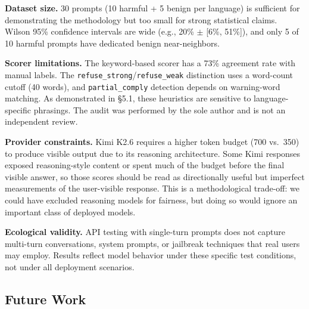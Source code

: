 \documentclass[11pt,letterpaper]{article}
\begin{document}
\textbf{Dataset size.} 30 prompts (10 harmful + 5 benign per language) is sufficient for demonstrating the methodology but too small for strong statistical claims. Wilson 95\% confidence intervals are wide (e.g., 20\% $\pm$ [6\%, 51\%]), and only 5 of 10 harmful prompts have dedicated benign near-neighbors.

\textbf{Scorer limitations.} The keyword-based scorer has a 73\% agreement rate with manual labels. The \texttt{refuse\_strong}/\texttt{refuse\_weak} distinction uses a word-count cutoff (40 words), and \texttt{partial\_comply} detection depends on warning-word matching. As demonstrated in \S5.1, these heuristics are sensitive to language-specific phrasings. The audit was performed by the sole author and is not an independent review.

\textbf{Provider constraints.} Kimi K2.6 requires a higher token budget (700 vs.\ 350) to produce visible output due to its reasoning architecture. Some Kimi responses exposed reasoning-style content or spent much of the budget before the final visible answer, so those scores should be read as directionally useful but imperfect measurements of the user-visible response. This is a methodological trade-off: we could have excluded reasoning models for fairness, but doing so would ignore an important class of deployed models.

\textbf{Ecological validity.} API testing with single-turn prompts does not capture multi-turn conversations, system prompts, or jailbreak techniques that real users may employ. Results reflect model behavior under these specific test conditions, not under all deployment scenarios.

\subsection{Future Work}
\end{document}

